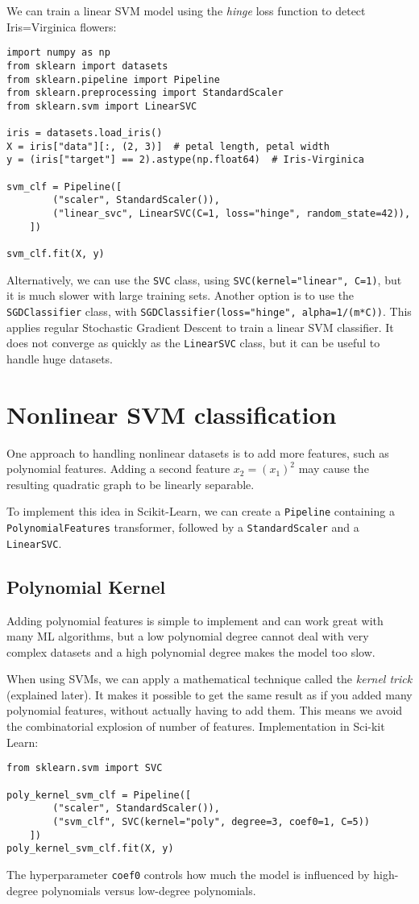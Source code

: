 \documentclass[letterpaper]{article}
\begin{document}
\newpage
We can train a linear SVM model using the \textsl{hinge} loss function to detect Iris=Virginica flowers: 

\begin{verbatim}
import numpy as np
from sklearn import datasets
from sklearn.pipeline import Pipeline
from sklearn.preprocessing import StandardScaler
from sklearn.svm import LinearSVC

iris = datasets.load_iris()
X = iris["data"][:, (2, 3)]  # petal length, petal width
y = (iris["target"] == 2).astype(np.float64)  # Iris-Virginica

svm_clf = Pipeline([
        ("scaler", StandardScaler()),
        ("linear_svc", LinearSVC(C=1, loss="hinge", random_state=42)),
    ])

svm_clf.fit(X, y)
\end{verbatim}

Alternatively, we can use the \texttt{SVC} class, using \texttt{SVC(kernel="linear", C=1)}, but it is much slower with large training sets. Another option is to use the \texttt{SGDClassifier} class, with \texttt{SGDClassifier(loss="hinge", alpha=1/(m*C))}. This applies regular Stochastic Gradient Descent to train a linear SVM classifier. It does not converge as quickly as the \texttt{LinearSVC} class, but it can be useful to handle huge datasets. 

\section{Nonlinear SVM classification}
One approach to handling nonlinear datasets is to add more features, such as polynomial features. Adding a second feature $x_{2} = (x_{1})^{2}$ may cause the resulting quadratic graph to be linearly separable. 

To implement this idea in Scikit-Learn, we can create a \texttt{Pipeline} containing a \texttt{PolynomialFeatures} transformer, followed by a \texttt{StandardScaler} and a \texttt{LinearSVC}. 

\subsection{Polynomial Kernel}
Adding polynomial features is simple to implement and can work great with many ML algorithms, but a low polynomial degree cannot deal with very complex datasets and a high polynomial degree makes the model too slow. 

When using SVMs, we can apply a mathematical technique called the \textsl{kernel trick} (explained later). It makes it possible to get the same result as if you added many polynomial features, without actually having to add them. This means we avoid the combinatorial explosion of number of features. Implementation in Sci-kit Learn:
\begin{verbatim}
from sklearn.svm import SVC

poly_kernel_svm_clf = Pipeline([
        ("scaler", StandardScaler()),
        ("svm_clf", SVC(kernel="poly", degree=3, coef0=1, C=5))
    ])
poly_kernel_svm_clf.fit(X, y)
\end{verbatim}
The hyperparameter \texttt{coef0} controls how much the model is influenced by high-degree polynomials versus low-degree polynomials. 
\end{document}
